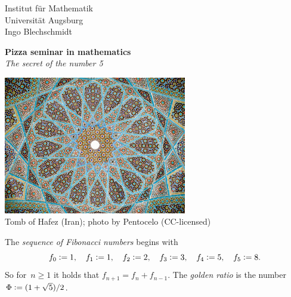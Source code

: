 \documentclass[a4paper,english,twoside]{scrartcl}
\newcommand{\defeq}{\vcentcolon=}
\begin{document}
\thispagestyle{empty}
Institut für Mathematik \\
Universität Augsburg \\
Ingo Blechschmidt

\begin{center}
  \textbf{Pizza seminar in mathematics} \\
  \emph{The secret of the number 5}
\end{center}
\vspace{0.5em}

\begin{center}\href{https://commons.wikimedia.org/wiki/File:Roof_hafez_tomb.jpg}{\includegraphics[width=0.60\textwidth]{hafez-tomb}} \\
\scriptsize Tomb of Hafez (Iran); photo by Pentocelo (CC-licensed)\par
\end{center}
\vspace{0.5em}

The \emph{sequence of Fibonacci numbers} begins with
\[
  f_0 \defeq 1, \quad
  f_1 \defeq 1, \quad
  f_2 \defeq 2, \quad
  f_3 \defeq 3, \quad
  f_4 \defeq 5, \quad
  f_5 \defeq 8.
\]
So for~$n \geq 1$ it holds that $f_{n+1} = f_n + f_{n-1}$. The \emph{golden ratio}
is the number~$\Phi \defeq (1+\sqrt{5})/2$.
\vspace{1em}
\enlargethispage{0.5em}
\end{document}
